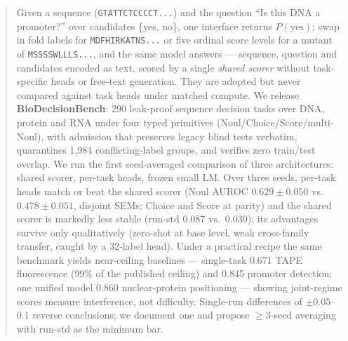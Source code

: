 \begin{abstract}
Given a sequence (\texttt{GTATTCTCCCCT...}) and the question ``Is this DNA a promoter?''
over candidates \{yes, no\}, one interface returns $P(\text{yes})$; swap in fold labels for
\texttt{MDFHIRKATNS...} or five ordinal score levels for a mutant of
\texttt{MSSSSWLLLS...}, and the same model answers --- sequence, question and candidates
encoded as text, scored by a single \emph{shared scorer} without task-specific heads or
free-text generation. They are adopted but never compared against task heads under matched
compute. We release \textbf{BioDecisionBench}: 290 leak-proof sequence decision
tasks over DNA, protein and RNA under four typed primitives (Noul/Choice/Score/multi-Noul),
with admission that preserves legacy blind tests verbatim, quarantines 1{,}984
conflicting-label groups, and verifies zero train/test overlap. We run the first seed-averaged comparison of three architectures: shared scorer,
per-task heads, frozen small LM. Over three seeds, per-task heads match or beat the shared
scorer (Noul AUROC $0.629\pm0.050$ vs.\ $0.478\pm0.051$, disjoint SEMs; Choice and Score at
parity) and the shared scorer is markedly less stable (run-std 0.087 vs.\ 0.030); its advantages survive only qualitatively (zero-shot at base level, weak
cross-family transfer, caught by a 32-label head). Under a practical
recipe the same benchmark yields near-ceiling baselines --- single-task 0.671 TAPE
fluorescence (99\% of the published ceiling) and 0.845 promoter detection; one unified
model 0.860 nuclear-protein positioning --- showing joint-regime scores measure
interference, not difficulty. Single-run differences of $\pm0.05$--$0.1$
reverse conclusions; we document one and propose $\ge3$-seed averaging with
run-std as the minimum bar.
\end{abstract}
